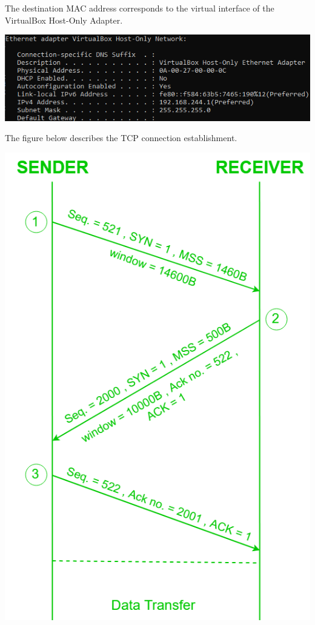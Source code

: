 \documentclass[12pt]{extarticle}
\begin{document}
The destination MAC address corresponds to the virtual interface of the VirtualBox Host-Only Adapter.
\begin{center}
\includegraphics[scale=0.8]{resources/5-3-2.png}
\end{center}
The figure below describes the TCP connection establishment.
\begin{center}
\includegraphics[scale=0.8]{resources/5-3-4.png}
\end{center}
\end{document}
